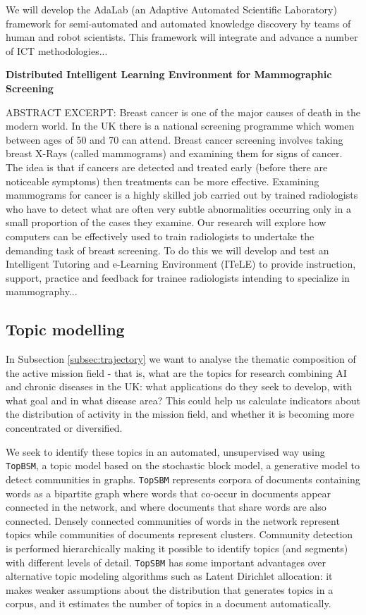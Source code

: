\documentclass[11pt]{article}
\begin{document}
\begin{tcolorbox}[fontupper=\small, parbox=false]
We will develop the AdaLab (an Adaptive Automated Scientific Laboratory) framework for semi-automated and automated knowledge discovery by teams of human and robot scientists. This framework will integrate and advance a number of ICT methodologies...

\textbf{Distributed Intelligent Learning Environment for Mammographic Screening}

ABSTRACT EXCERPT: Breast cancer is one of the major causes of death in the modern world. In the UK there is a national screening programme which women between ages of 50 and 70 can attend. Breast cancer screening involves taking breast X-Rays (called mammograms) and examining them for signs of cancer. The idea is that if cancers are detected and treated early (before there are noticeable symptoms) then treatments can be more effective. Examining mammograms for cancer is a highly skilled job carried out by trained radiologists who have to detect what are often very subtle abnormalities occurring only in a small proportion of the cases they examine. Our research will explore how computers can be effectively used to train radiologists to undertake the demanding task of breast screening. To do this we will develop and test an Intelligent Tutoring and e-Learning Environment (ITeLE) to provide instruction, support, practice and feedback for trainee radiologists intending to specialize in mammography...
\end{tcolorbox}

\subsection{Topic modelling}

In Subsection \ref{subsec:trajectory} we want to analyse the thematic composition of the active mission field - that is, what are the topics for research combining AI and chronic diseases in the UK: what applications do they seek to develop, with what goal and in what disease area? This could help us calculate indicators about the distribution of activity in the mission field, and whether it is becoming more concentrated or diversified. 

We seek to identify these topics in an automated, unsupervised way using \texttt{TopBSM}, a topic model based on the stochastic block model, a generative model to detect communities in graphs. \texttt{TopSBM} represents corpora of documents containing words as a bipartite graph where words that co-occur in documents appear connected in the network, and where documents that share words are also connected. Densely connected communities of words in the network represent topics while communities of documents represent clusters. Community detection is performed hierarchically making it possible to identify topics (and segments) with different levels of detail. \texttt{TopSBM} has some important advantages over alternative topic modeling algorithms such as Latent Dirichlet allocation: it makes weaker assumptions about the distribution that generates topics in a corpus, and it estimates the number of topics in a document automatically. 
\end{document}

